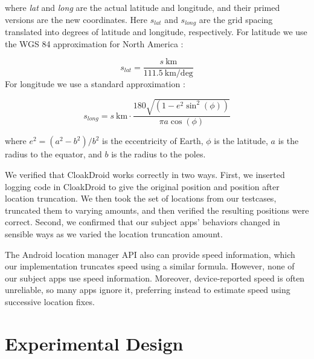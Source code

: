 \documentclass[10pt, conference, compsocconf]{IEEEtran}
\newcommand{\comment}[3][\color{red}]{{#1{[{#2}: {#3}]}}}
\newcommand{\kris}[1]{\comment[\color{orange}]{km}{#1}}
\newcommand{\jeff}[1]{\comment[\color{green}]{JSF}{#1}}
\newcommand{\fuzzer}{CloakDroid\xspace}
\begin{document}
\noindent where \textit{lat} and \textit{long} are the actual latitude and
longitude, and their primed versions are the new coordinates. Here
$s_\textit{lat}$ and $s_\textit{long}$ are the grid spacing translated
into degrees of latitude and longitude, respectively.
For latitude we use the WGS 84 approximation for North America \cite{latitude-calculator}:

\begin{displaymath}
s_\textit{lat} = \frac{s~\textrm{km}}{111.5~\textrm{km/deg}}
\end{displaymath}
For longitude we use a standard approximation \cite{rapp:geometric}:

\[
s_\textit{long} = s~\textrm{km} \cdot 
  \frac {180 \sqrt{(1 - e^2 \sin^2(\phi))}}
  {\pi a \cos(\phi)}
\]

\noindent where $e^2 = (a^2 - b^2)/b^2$ is the eccentricity of Earth, $\phi$ is
the latitude, $a$ is the radius to the
equator, and $b$ is the radius to the poles.

We verified that \fuzzer{} works correctly in two ways.  First, we 
inserted logging code in \fuzzer{} to give the original position and 
position after location truncation.  We then took the set of locations from our 
testcases, truncated them to varying amounts, and then verified the
resulting positions were correct.  Second, we confirmed that our subject apps'
behaviors changed in sensible ways as we varied the location truncation 
amount.

The Android location
manager API also can provide speed information, which our
implementation truncates speed using a similar formula. However, none
of our subject apps use speed information. Moreover, device-reported
speed is often unreliable, so many apps ignore it, preferring
instead to estimate speed using successive location fixes.

\section{Experimental Design}
\label{sec:design}
\end{document}
